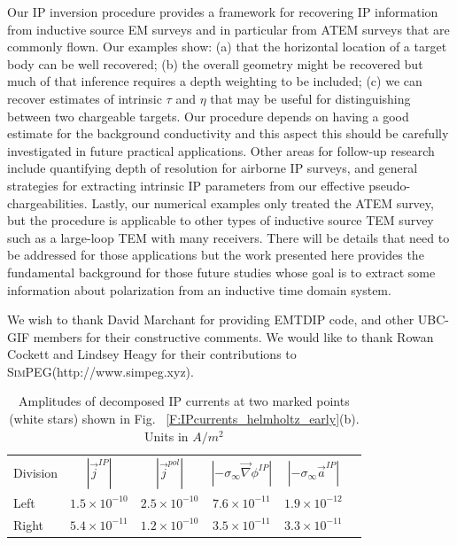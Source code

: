 \documentclass[extra,mreferee]{gji}
\newcommand{\SimPEG}{\textsc{SimPEG}\xspace}
\newcommand{\grad}{\vec \nabla}
\newcommand{\siginf}{\sigma_\infty}
\renewcommand {\j}  { {\vec j} }
\begin{document}
Our IP inversion procedure provides a framework for recovering IP information from inductive source EM surveys and in particular from ATEM surveys that are commonly flown. Our examples show: (a)  that the horizontal location of a target body can be well recovered; (b) the overall geometry might be recovered but much of that inference requires a depth weighting to be included; (c)  we can recover estimates of intrinsic $\tau$ and $\eta$ that may be useful for distinguishing between two chargeable targets. Our procedure depends on having a good estimate for the background conductivity and this aspect this should be carefully investigated in future practical applications.  Other areas for follow-up research include quantifying  depth of resolution for  airborne IP surveys, and general strategies for extracting  intrinsic IP parameters from our effective pseudo-chargeabilities.
Lastly, our numerical examples  only treated the ATEM survey, but the procedure is applicable to other types of inductive source TEM survey such as a large-loop TEM with many receivers. There will be details that need to be addressed for those applications but the work presented here provides the  fundamental background for those future studies whose goal is to extract some information about polarization from an inductive time domain system.

\begin{acknowledgments}
  We wish to thank David Marchant for providing EMTDIP code, and other UBC-GIF members for their constructive comments. We would like to thank Rowan Cockett and Lindsey Heagy for their contributions to \SimPEG (http://www.simpeg.xyz).
\end{acknowledgments}



\clearpage

\begin{table}
 \caption{Amplitudes of decomposed IP currents at two marked points (white stars) shown in Fig. ~\ref{F:IPcurrents_helmholtz_early}(b). Units in $A/m^2$}
 \label{T:DecompjIPcond}
 \begin{tabular}{@{}lccccc}
  Division & $| \j^{IP} |$ & $| \j^{pol} |$ & $| -\siginf\grad \phi^{IP} |$ & $| -\siginf\vec{a}^{IP} |$ \\
  Left  & $1.5\times 10^{-10}$ & $2.5\times 10^{-10}$ & $7.6\times 10^{-11}$ & $1.9\times 10^{-12}$ \\
  Right & $5.4\times 10^{-11}$ & $1.2\times 10^{-10}$ & $3.5\times 10^{-11}$ & $3.3\times 10^{-11}$ \\
 \end{tabular}
\end{table}
\end{document}
